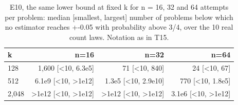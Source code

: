 \begin{table}[t]
\centering
\small
\begin{tabular}{lrrr}
\toprule
k & n=16 & n=32 & n=64 \\
\midrule
128 & 1,600 [<10, 6.3e5] & 71 [<10, 840] & 24 [<10, 67] \\
512 & 6.1e9 [<10, >1e12] & 1.3e5 [<10, 2.9e10] & 770 [<10, 1.8e5] \\
2,048 & >1e12 [<10, >1e12] & >1e12 [<10, >1e12] & 3.1e6 [<10, >1e12] \\
\bottomrule
\end{tabular}
\caption{E10, the same lower bound at fixed k for n = 16, 32 and 64 attempts per problem: median [smallest, largest] number of problems below which no estimator reaches +-0.05 with probability above 3/4, over the 10 real count laws. Notation as in T15.}
\label{tab:T15c_problems_needed_fixed_k}
\end{table}
